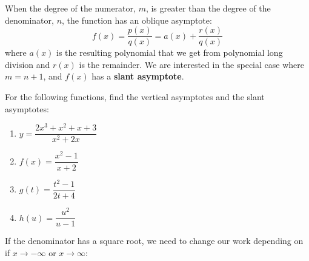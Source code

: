 \documentclass[../mathNotesPreamble]{subfiles}
\begin{document}
      \begin{defn*}
      When the degree of the numerator, $m$, is greater than the degree of the denominator, $n$, the function has an oblique asymptote:
        $$f(x)=\dfrac{p(x)}{q(x)}=a(x)+\dfrac{r(x)}{q(x)}$$
      where $a(x)$ is the resulting polynomial that we get from polynomial long division and $r(x)$ is the remainder. We are interested in the special case where $m=n+1$, and $f(x)$ has a \textbf{slant asymptote}.
      \end{defn*}
      \begin{ex*}
        For the following functions, find the vertical asymptotes and the slant asymptotes:
      \end{ex*}
      \begin{enumerate}[itemsep=\stretch{1}]
        \item $y=\dfrac{2x^3+x^2+x+3}{x^2+2x}$
        \item $f(x)=\dfrac{x^2-1}{x+2}$
      \end{enumerate}
      \pagebreak
      \begin{enumerate}[itemsep=\stretch{1}]
        \setcounter{enumi}{2}
        \item $g(t)=\dfrac{t^2-1}{2t+4}$
        \item $h(u)=\dfrac{u^2}{u-1}$
      \end{enumerate}
      \pagebreak
      If the denominator has a square root, we need to change our work depending on if $x\to-\infty$ or $x\to\infty$:\\
      
\end{document}
